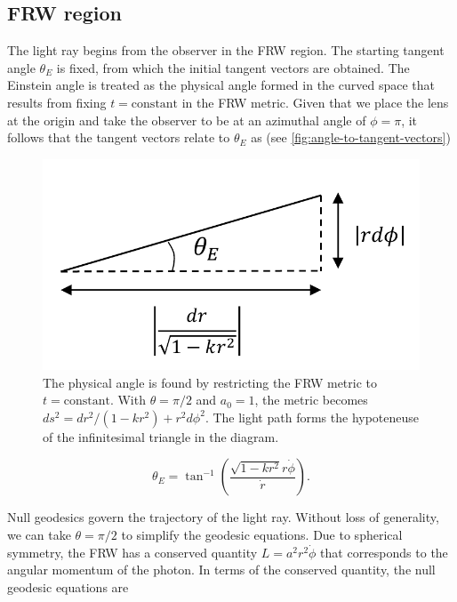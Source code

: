 \subsection{FRW region}

The light ray begins from the observer in the FRW region. The starting tangent angle $\theta_E$ is fixed, from which the initial tangent vectors are obtained. The Einstein angle is treated as the physical angle formed in the curved space that results from fixing $t = \text{constant}$ in the FRW metric. Given that we place the lens at the origin and take the observer to be at an azimuthal angle of $\phi = \pi$, it follows that the tangent vectors relate to $\theta_E$ as (see \autoref{fig:angle-to-tangent-vectors})

\begin{figure}
  \centering
  \includegraphics[height=0.2\linewidth]{images/angle.pdf}
  \caption{The physical angle is found by restricting the FRW metric to $t = \text{constant}$. With $\theta = \pi/2$ and $a_0 = 1$, the metric becomes $ds^2 = dr^2 / (1-kr^2) + r^2 d\phi^2$. The light path forms the hypoteneuse of the infinitesimal triangle in the diagram. }
  \label{fig:angle-to-tangent-vectors}
\end{figure}

\begin{equation}
  \theta_E = \tan^{-1}\left (\frac{\sqrt{1-kr^2}r\dot{\phi}}{\dot{r}}\right ).
  \label{eq:angle-to-tangent-vectors}
\end{equation}

Null geodesics govern the trajectory of the light ray. Without loss of generality, we can take $\theta = \pi/2$ to simplify the geodesic equations. Due to spherical symmetry, the FRW has a conserved quantity $L = a^2 r^2 \dot{\phi}$ that corresponds to the angular momentum of the photon. In terms of the conserved quantity, the null geodesic equations are

